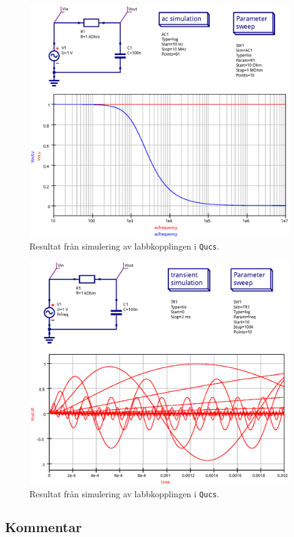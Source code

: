 \begin{figure}
    \centering
    \includegraphics[width=\linewidth]{sim/ee466_lab-4_prj/uppgift-1_ac}
    \caption[Labbkopplingens frekvensåtergivning. Simulering i \texttt{Qucs}.]
    {Resultat från simulering av labbkopplingen i \texttt{Qucs}.}
    \label{bode-sim}
\end{figure}

\begin{figure}
    \centering
    \includegraphics[width=\linewidth]{sim/ee466_lab-4_prj/uppgift-1_tran}
    \caption[Labbkopplingens transientrespons för olika frekvenser. Simulering i \texttt{Qucs}.]
    {Resultat från simulering av labbkopplingen i \texttt{Qucs}.}
    \label{bode-sim}
\end{figure}

\subsection{Kommentar}\label{}


